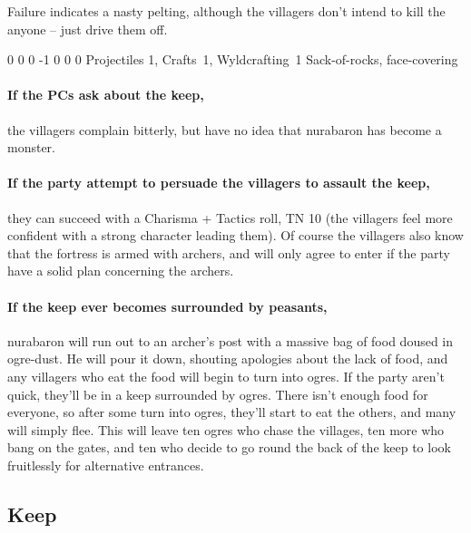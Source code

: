 \begin{multicols}{2}
Failure indicates a nasty pelting, although the villagers don't intend to kill the anyone -- just drive them off.

{0}%
{0}%
{{0}%
{-1}%
{0}}%
{0}%
{0}%
{Projectiles 1, Crafts~1, Wyldcrafting~1}%
{Sack-of-rocks, face-covering}%
{}

\paragraph{If the PCs ask about the keep,}
the villagers complain bitterly, but have no idea that \gls{nurabaron} has become a monster.

\paragraph{If the party attempt to persuade the villagers to assault the keep,}
they can succeed with a Charisma + Tactics roll, TN 10
(the villagers feel more confident with a strong character leading them).
Of course the villagers also know that the fortress is armed with archers, and will only agree to enter if the party have a solid plan concerning the archers.

\paragraph{If the keep ever becomes surrounded by peasants,}
\gls{nurabaron} will run out to an archer's post with a massive bag of food doused in ogre-dust.
He will pour it down, shouting apologies about the lack of food, and any villagers who eat the food will begin to turn into ogres.
If the party aren't quick, they'll be in a keep surrounded by ogres.
There isn't enough food for everyone, so after some turn into ogres, they'll start to eat the others, and many will simply flee.
This will leave ten ogres who chase the villages, ten more who bang on the gates, and ten who decide to go round the back of the keep to look fruitlessly for alternative entrances.


\subsection{ Keep}


\end{multicols}
